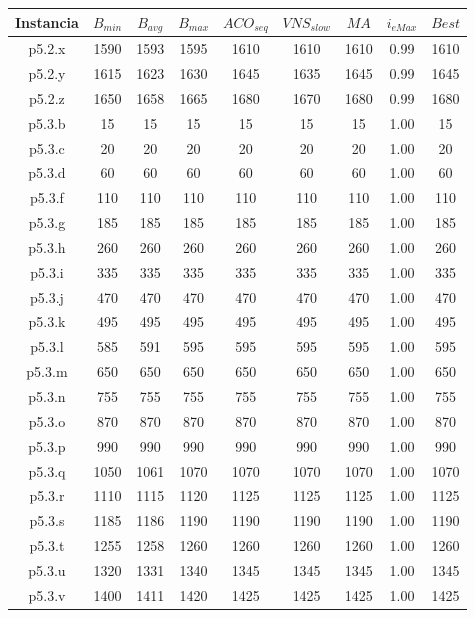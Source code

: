 \begin{table}
\begin{center}
\begin{tabular}{ |c|c|c|c|c|c|c|c|c| } 
\hline
Instancia & $B_{min}$ & $B_{avg}$ & $B_{max}$ & $ACO_{seq}$ & $VNS_{slow}$ & $MA$ & $i_{eMax}$ & $Best$ \\
\hline
p5.2.x & 1590 & 1593 & 1595 & 1610 & 1610 & 1610 & 0.99 & 1610  \\
p5.2.y & 1615 & 1623 & 1630 & 1645 & 1635 & 1645 & 0.99 & 1645  \\
p5.2.z & 1650 & 1658 & 1665 & 1680 & 1670 & 1680 & 0.99 & 1680  \\
p5.3.b & 15 & 15 & 15 & 15 & 15 & 15 & 1.00 & 15  \\
p5.3.c & 20 & 20 & 20 & 20 & 20 & 20 & 1.00 & 20  \\
p5.3.d & 60 & 60 & 60 & 60 & 60 & 60 & 1.00 & 60  \\
p5.3.f & 110 & 110 & 110 & 110 & 110 & 110 & 1.00 & 110  \\
p5.3.g & 185 & 185 & 185 & 185 & 185 & 185 & 1.00 & 185  \\
p5.3.h & 260 & 260 & 260 & 260 & 260 & 260 & 1.00 & 260  \\
p5.3.i & 335 & 335 & 335 & 335 & 335 & 335 & 1.00 & 335  \\
p5.3.j & 470 & 470 & 470 & 470 & 470 & 470 & 1.00 & 470  \\
p5.3.k & 495 & 495 & 495 & 495 & 495 & 495 & 1.00 & 495  \\
p5.3.l & 585 & 591 & 595 & 595 & 595 & 595 & 1.00 & 595  \\
p5.3.m & 650 & 650 & 650 & 650 & 650 & 650 & 1.00 & 650  \\
p5.3.n & 755 & 755 & 755 & 755 & 755 & 755 & 1.00 & 755  \\
p5.3.o & 870 & 870 & 870 & 870 & 870 & 870 & 1.00 & 870  \\
p5.3.p & 990 & 990 & 990 & 990 & 990 & 990 & 1.00 & 990  \\
p5.3.q & 1050 & 1061 & 1070 & 1070 & 1070 & 1070 & 1.00 & 1070  \\
p5.3.r & 1110 & 1115 & 1120 & 1125 & 1125 & 1125 & 1.00 & 1125  \\
p5.3.s & 1185 & 1186 & 1190 & 1190 & 1190 & 1190 & 1.00 & 1190  \\
p5.3.t & 1255 & 1258 & 1260 & 1260 & 1260 & 1260 & 1.00 & 1260  \\
p5.3.u & 1320 & 1331 & 1340 & 1345 & 1345 & 1345 & 1.00 & 1345  \\
p5.3.v & 1400 & 1411 & 1420 & 1425 & 1425 & 1425 & 1.00 & 1425  \\

\end{tabular}
\end{center}
\end{table}
